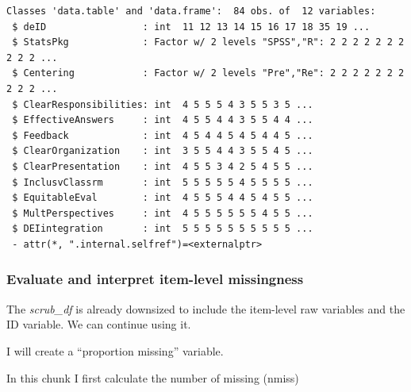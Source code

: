 \documentclass[
  11pt,
]{book}
\newenvironment{Shaded}{\begin{snugshade}}{\end{snugshade}}
\newcommand{\AttributeTok}[1]{\textcolor[rgb]{0.27,0.27,0.27}{#1}}
\newcommand{\CommentTok}[1]{\textcolor[rgb]{0.37,0.37,0.37}{\textit{#1}}}
\newcommand{\DecValTok}[1]{\textcolor[rgb]{0.06,0.06,0.06}{#1}}
\newcommand{\FunctionTok}[1]{\textcolor[rgb]{0.27,0.27,0.27}{\textbf{#1}}}
\newcommand{\NormalTok}[1]{#1}
\newcommand{\OtherTok}[1]{\textcolor[rgb]{0.37,0.37,0.37}{#1}}
\newcommand{\SpecialCharTok}[1]{\textcolor[rgb]{0.43,0.43,0.43}{\textbf{#1}}}
\begin{document}
\begin{verbatim}
Classes 'data.table' and 'data.frame':  84 obs. of  12 variables:
 $ deID                 : int  11 12 13 14 15 16 17 18 35 19 ...
 $ StatsPkg             : Factor w/ 2 levels "SPSS","R": 2 2 2 2 2 2 2 2 2 2 ...
 $ Centering            : Factor w/ 2 levels "Pre","Re": 2 2 2 2 2 2 2 2 2 2 ...
 $ ClearResponsibilities: int  4 5 5 5 4 3 5 5 3 5 ...
 $ EffectiveAnswers     : int  4 5 5 4 4 3 5 5 4 4 ...
 $ Feedback             : int  4 5 4 4 5 4 5 4 4 5 ...
 $ ClearOrganization    : int  3 5 5 4 4 3 5 5 4 5 ...
 $ ClearPresentation    : int  4 5 5 3 4 2 5 4 5 5 ...
 $ InclusvClassrm       : int  5 5 5 5 5 4 5 5 5 5 ...
 $ EquitableEval        : int  4 5 5 5 4 4 5 4 5 5 ...
 $ MultPerspectives     : int  4 5 5 5 5 5 5 4 5 5 ...
 $ DEIintegration       : int  5 5 5 5 5 5 5 5 5 5 ...
 - attr(*, ".internal.selfref")=<externalptr> 
\end{verbatim}

\hypertarget{evaluate-and-interpret-item-level-missingness}{%
\subsubsection*{Evaluate and interpret item-level missingness}\label{evaluate-and-interpret-item-level-missingness}}


The \emph{scrub\_df} is already downsized to include the item-level raw variables and the ID variable. We can continue using it.

I will create a ``proportion missing'' variable.

In this chunk I first calculate the number of missing (nmiss)

\begin{Shaded}
\end{Shaded}
\end{document}
